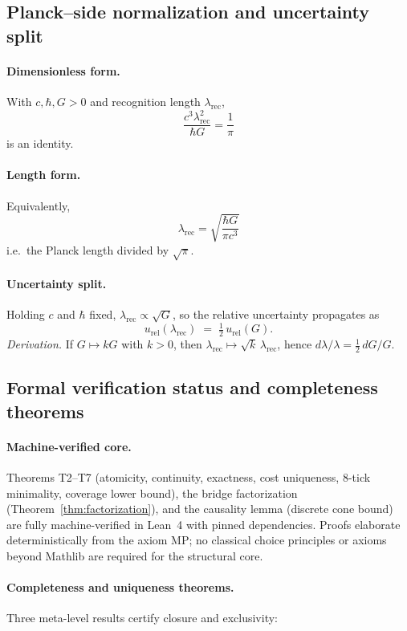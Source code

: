 \documentclass[11pt]{article}
\begin{document}
\subsection{Planck–side normalization and uncertainty split}\label{subsec:planck-identity}

\paragraph{Dimensionless form.}
With $c,\hbar,G>0$ and recognition length $\lambda_{\mathrm{rec}}$,
\[
\boxed{\frac{c^3\lambda_{\mathrm{rec}}^2}{\hbar G} = \frac{1}{\pi}}
\]
is an identity.

\paragraph{Length form.}
Equivalently,
\[
\boxed{\lambda_{\mathrm{rec}} = \sqrt{\frac{\hbar G}{\pi c^3}}}
\]
i.e.\ the Planck length divided by $\sqrt{\pi}$.

\paragraph{Uncertainty split.}
Holding $c$ and $\hbar$ fixed, $\lambda_{\mathrm{rec}}\propto \sqrt{G}$, so the relative uncertainty propagates as
\[
u_{\mathrm{rel}}(\lambda_{\mathrm{rec}}) \;=\; \tfrac12\,u_{\mathrm{rel}}(G).
\]
\emph{Derivation.} If $G\mapsto kG$ with $k>0$, then $\lambda_{\mathrm{rec}}\mapsto \sqrt{k}\,\lambda_{\mathrm{rec}}$, hence $d\lambda/\lambda=\tfrac12\,dG/G$.

\subsection{Formal verification status and completeness theorems}\label{subsec:meta-stack}

\paragraph{Machine-verified core.} Theorems T2--T7 (atomicity, continuity, exactness, cost uniqueness, 8-tick minimality, coverage lower bound), the bridge factorization (Theorem~\ref{thm:factorization}), and the causality lemma (discrete cone bound) are fully machine-verified in Lean~4 with pinned dependencies. Proofs elaborate deterministically from the axiom MP; no classical choice principles or axioms beyond Mathlib are required for the structural core.

\paragraph{Completeness and uniqueness theorems.} Three meta-level results certify closure and exclusivity:
\end{document}
